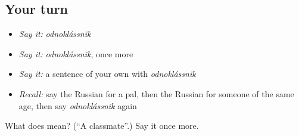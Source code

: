 \subsection*{Your turn}
\begin{itemize}
\raggedright
  \item \emph{Say it:} \emph{odnoklássnik}
  \item \emph{Say it:} \emph{odnoklássnik}, once more
  \item \emph{Say it:} a sentence of your own with \emph{odnoklássnik}
  \item \emph{Recall:} say the Russian for a pal, then the Russian for someone of the same age, then say \emph{odnoklássnik} again
\end{itemize}

\begin{tcolorbox}[breakable,colback=teal!4,colframe=teal!35!black,title={Before you move on}]
What does  mean? (\textquotedblleft{}A classmate\textquotedblright{}.) Say it once more.
\end{tcolorbox}
